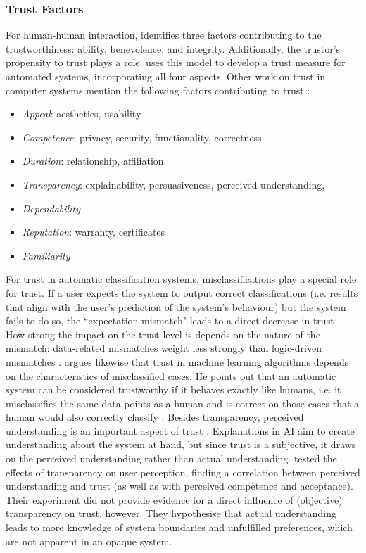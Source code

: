 \subsubsection{Trust Factors}
For human-human interaction, \cite{mayer1995integrative} identifies three factors contributing to the trustworthiness: ability, benevolence, and integrity. Additionally, the trustor's propensity to trust plays a role. \cite{korber2018theoretical} uses this model to develop a trust measure for automated systems, incorporating all four aspects. Other work on trust in computer systems mention the following factors contributing to trust \cite{artz2007survey, becker2006trustworthy, bedi2006assessing, corritore2005measuring, cramer2008effects, korber2018theoretical, mohammadi2013trustworthiness}:
\begin{itemize}
	\item \textit{Appeal}: aesthetics, usability
	\item \textit{Competence}: privacy, security, functionality, correctness
	\item \textit{Duration}: relationship, affiliation
	\item \textit{Transparency}: explainability, persuasiveness, perceived understanding, 
	\item \textit{Dependability}
	\item \textit{Reputation}: warranty, certificates
	\item \textit{Familiarity}
\end{itemize}
For trust in automatic classification systems, misclassifications play a special role for trust. If a user expects the system to output correct classifications (i.e. results that align with the user's prediction of the system's behaviour) but the system fails to do so, the ``expectation mismatch" leads to a direct decrease in trust \cite{glass2008toward}. How strong the impact on the trust level is depends on the nature of the mismatch: data-related mismatches weight less strongly than logic-driven mismatches \cite{glass2008toward}. \cite{lipton2016mythos} argues likewise that trust in machine learning algorithms depends on the characteristics of misclassified cases. He points out that an automatic system can be considered trustworthy if it behaves exactly like humans, i.e. it misclassifies the same data points as a human and is correct on those cases that a human would also correctly classify \cite{lipton2016mythos}.\newline
Besides transparency, perceived understanding is an important aspect of trust \cite{cramer2008effects}. Explanations in AI aim to create understanding about the system at hand, but since trust is a subjective, it draws on the perceived understanding rather than actual understanding. \cite{cramer2008effects} tested the effects of transparency on user perception, finding a correlation between perceived understanding and trust (as well as with perceived competence and acceptance). Their experiment did not provide evidence for a direct influence of (objective) transparency on trust, however. They hypothesise that actual understanding leads to more knowledge of system boundaries and unfulfilled preferences, which are not apparent in an opaque system. 


